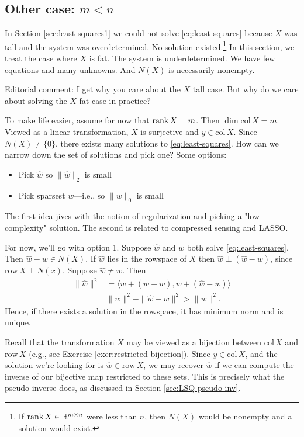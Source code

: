 \documentclass{book}
\newcommand{\R}{\mathbb{R}}
\newcommand{\myrank}{\textup{rank}\,}
\newcommand{\col}{\text{col}\,}
\newcommand{\row}{\text{row}\,}
\begin{document}
\subsection{Other case: $m<n$}

In Section \ref{sec:least-squares1} we could not solve \eqref{eq:least-squares} because $X$ was tall and the system was overdetermined. No solution existed.\footnote{If $\myrank X\in \R^{m\times n}$ were less than $n$, then $N(X)$ would be nonempty and a solution would exist.} In this section, we treat the case where $X$ is fat. The system is underdetermined. We have few equations and many unknowns. And $N(X)$ is necessarily nonempty. 

Editorial comment: I get why you care about the $X$ tall case. But why do we care about solving the $X$ fat case in practice? 

To make life easier, assume for now that $\myrank X = m$. Then $\dim \col X = m$. Viewed as a linear transformation, $X$ is surjective and $y\in \col X$. Since $N(X) \not= \{0\}$, there exists many solutions to \eqref{eq:least-squares}. How can we narrow down the set of solutions and pick one? Some options:
\begin{itemize}
    \item Pick $\hat w$ so $\|\hat w\|_2$ is small
    \item Pick sparsest $w$---i.e., so $\|w\|_0$ is small
\end{itemize}
The first idea jives with the notion of regularization and picking a "low complexity" solution. The second is related to compressed sensing and LASSO. 

For now, we'll go with option 1. Suppose $\hat w$ and $w$ both solve \eqref{eq:least-squares}. Then $\hat w - w \in N(X)$. If $\hat w$ lies in the rowspace of $X$ then $\hat w \perp (\hat w - w)$, since $\row X \perp N(x)$. Suppose $\hat w \not = w$. Then
\begin{align}
  \|\hat w\|^2 & = \langle w + (\hat w - w), w + (\hat w - w)  \rangle\\
  & \|w\|^2 - \|\hat w - w\|^2 > \|w\|^2.
\end{align}
Hence, if there exists a solution in the rowspace, it has minimum norm and is unique. 

Recall that the transformation $X$ may be viewed as a bijection between $\col X$ and $\row X$ (e.g., see Exercise \ref{exer:restricted-bijection}). Since $y \in \col X$, and the solution we're looking for is $\hat w \in \row X$, we may recover $\hat w$ if we can compute the inverse of our bijective map restricted to these sets. This is precisely what the pseudo inverse does, as discussed in Section \ref{sec:LSQ-pseudo-inv}. 
\end{document}
